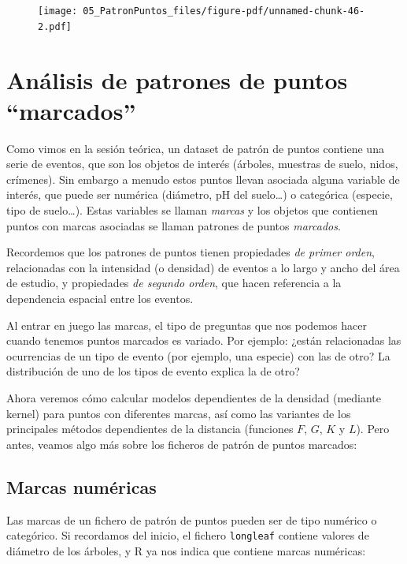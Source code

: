\documentclass[
  letterpaper,
  DIV=11,
  numbers=noendperiod]{scrreprt}
\begin{document}
\begin{figure}[H]

{\centering \texttt{[image: 05\_PatronPuntos\_files/figure-pdf/unnamed-chunk-46-2.pdf]}

}

\end{figure}

\hypertarget{anuxe1lisis-de-patrones-de-puntos-marcados}{%
\section{Análisis de patrones de puntos
``marcados''}\label{anuxe1lisis-de-patrones-de-puntos-marcados}}

Como vimos en la sesión teórica, un dataset de patrón de puntos contiene
una serie de eventos, que son los objetos de interés (árboles, muestras
de suelo, nidos, crímenes). Sin embargo a menudo estos puntos llevan
asociada alguna variable de interés, que puede ser numérica (diámetro,
pH del suelo\ldots) o categórica (especie, tipo de suelo\ldots). Estas
variables se llaman \emph{marcas} y los objetos que contienen puntos con
marcas asociadas se llaman patrones de puntos \emph{marcados}.

Recordemos que los patrones de puntos tienen propiedades \emph{de primer
orden}, relacionadas con la intensidad (o densidad) de eventos a lo
largo y ancho del área de estudio, y propiedades \emph{de segundo
orden}, que hacen referencia a la dependencia espacial entre los
eventos.

Al entrar en juego las marcas, el tipo de preguntas que nos podemos
hacer cuando tenemos puntos marcados es variado. Por ejemplo: ¿están
relacionadas las ocurrencias de un tipo de evento (por ejemplo, una
especie) con las de otro? La distribución de uno de los tipos de evento
explica la de otro?

Ahora veremos cómo calcular modelos dependientes de la densidad
(mediante kernel) para puntos con diferentes marcas, así como las
variantes de los principales métodos dependientes de la distancia
(funciones \(F\), \(G\), \(K\) y \(L\)). Pero antes, veamos algo más
sobre los ficheros de patrón de puntos marcados:

\hypertarget{marcas-numuxe9ricas}{%
\subsection{Marcas numéricas}\label{marcas-numuxe9ricas}}

Las marcas de un fichero de patrón de puntos pueden ser de tipo numérico
o categórico. Si recordamos del inicio, el fichero \texttt{longleaf}
contiene valores de diámetro de los árboles, y R ya nos indica que
contiene marcas numéricas:
\end{document}
